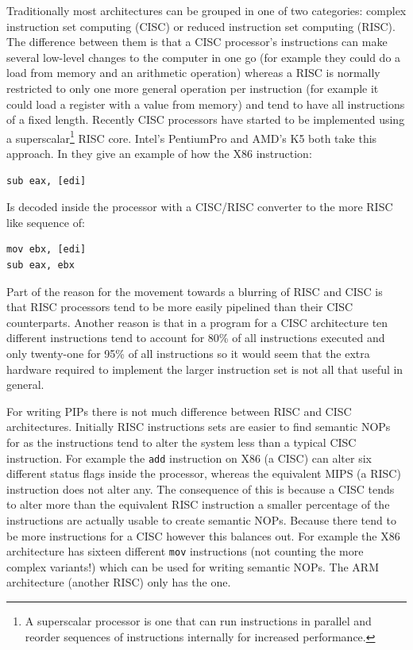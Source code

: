 \documentclass[10pt,]{book}
\begin{document}
Traditionally most architectures can be grouped in one of two
categories: complex instruction set computing (CISC) or reduced
instruction set computing (RISC). The difference between them is that a
CISC processor's instructions can make several low-level changes to the
computer in one go (for example they could do a load from memory and an
arithmetic operation) whereas a RISC is normally restricted to only one
more general operation per instruction (for example it could load a
register with a value from memory) and tend to have all instructions of
a fixed length. Recently CISC processors have started to be implemented
using a superscalar\footnote{A superscalar processor is one that can run
  instructions in parallel and reorder sequences of instructions
  internally for increased performance.} RISC
core\autocite{Sima:1997tv}. Intel's PentiumPro and AMD's K5 both take
this approach. In \autocite{Sima:1997tv} they give an example of how the
X86 instruction:

\begin{lstlisting}
sub eax, [edi]
\end{lstlisting}
Is decoded inside the processor with a CISC/RISC converter to the more
RISC like sequence of:

\begin{lstlisting}
mov ebx, [edi]
sub eax, ebx
\end{lstlisting}
Part of the reason for the movement towards a blurring of RISC and CISC
is that RISC processors tend to be more easily pipelined than their CISC
counterparts\autocite{Stallings:1988ix}. Another reason is that in a
program for a CISC architecture ten different instructions tend to
account for 80\% of all instructions executed and only twenty-one for
95\% of all instructions\autocite{Alexander:1975ul} so it would seem
that the extra hardware required to implement the larger instruction set
is not all that useful in general.

For writing PIPs there is not much difference between RISC and CISC
architectures. Initially RISC instructions sets are easier to find
semantic NOPs for as the instructions tend to alter the system less than
a typical CISC instruction. For example the \lstinline!add! instruction
on X86 (a CISC) can alter six different status flags inside the
processor\autocite{IntelCorporation:1997ta}, whereas the equivalent MIPS
(a RISC) instruction does not alter
any\autocite{MIPSTechnologiesInc:2011ta}. The consequence of this is
because a CISC tends to alter more than the equivalent RISC instruction
a smaller percentage of the instructions are actually usable to create
semantic NOPs. Because there tend to be more instructions for a CISC
however this balances out. For example the X86 architecture has sixteen
different \lstinline!mov! instructions (not counting the more complex
variants!) which can be used for writing semantic NOPs\autocite{refx86}.
The ARM architecture (another RISC) only has the
one\autocite{Limited:vc}.
\end{document}
